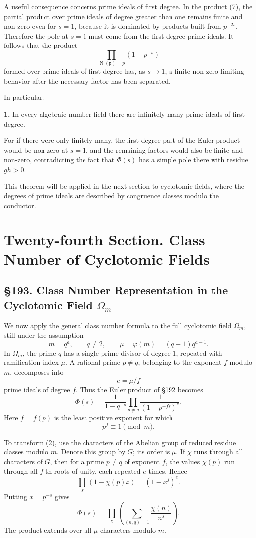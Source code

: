 \documentclass[11pt,a4paper]{book}
\newcommand{\webersection}[2]{\clearpage\section*{\S #1. #2}}
\newcommand{\booktitle}[1]{\clearpage\chapter*{#1}}
\providecommand{\Om}{\Omega_m}
\providecommand{\idealp}{\mathfrak p}
\providecommand{\N}{\operatorname{N}}
\begin{document}
A useful consequence concerns prime ideals of first degree.  In the product (7), the partial product over prime ideals of degree greater than one remains finite and non-zero even for \(s=1\), because it is dominated by products built from \(p^{-2s}\).  Therefore the pole at \(s=1\) must come from the first-degree prime ideals.  It follows that the product
\[
  \prod_{\N(\idealp)=p}
  (1-p^{-s})
\tag{10}
\]
formed over prime ideals of first degree has, as \(s\to1\), a finite non-zero limiting behavior after the necessary factor has been separated.

In particular:

\textbf{1.} In every algebraic number field there are infinitely many prime ideals of first degree.

For if there were only finitely many, the first-degree part of the Euler product would be non-zero at \(s=1\), and the remaining factors would also be finite and non-zero, contradicting the fact that \(\Phi(s)\) has a simple pole there with residue \(gh>0\).

This theorem will be applied in the next section to cyclotomic fields, where the degrees of prime ideals are described by congruence classes modulo the conductor.

\booktitle{Twenty-fourth Section. Class Number of Cyclotomic Fields}

\webersection{193}{Class Number Representation in the Cyclotomic Field \(\Om\)}

We now apply the general class number formula to the full cyclotomic field \(\Om\), still under the assumption
\[
  m=q^a,\qquad q\ne2,\qquad\mu=\varphi(m)=(q-1)q^{a-1}.
\tag{1}
\]
In \(\Om\), the prime \(q\) has a single prime divisor of degree \(1\), repeated with ramification index \(\mu\).  A rational prime \(p\ne q\), belonging to the exponent \(f\) modulo \(m\), decomposes into
\[
  e=\mu/f
\]
prime ideals of degree \(f\).  Thus the Euler product of \S192 becomes
\[
  \Phi(s)=\frac1{1-q^{-s}}
  \prod_{p\ne q}
  \frac1{(1-p^{-fs})^e}.
\tag{2}
\]
Here \(f=f(p)\) is the least positive exponent for which
\[
  p^f\equiv1\pmod m.
\tag{3}
\]

To transform (2), use the characters of the Abelian group of reduced residue classes modulo \(m\).  Denote this group by \(G\); its order is \(\mu\).  If \(\chi\) runs through all characters of \(G\), then for a prime \(p\ne q\) of exponent \(f\), the values \(\chi(p)\) run through all \(f\)-th roots of unity, each repeated \(e\) times.  Hence
\[
  \prod_\chi (1-\chi(p)x)=(1-x^f)^e.
\tag{4}
\]
Putting \(x=p^{-s}\) gives
\[
  \Phi(s)=
  \prod_{\chi}\left(\sum_{(n,q)=1}\frac{\chi(n)}{n^s}\right).
\tag{5}
\]
The product extends over all \(\mu\) characters modulo \(m\).
\end{document}

